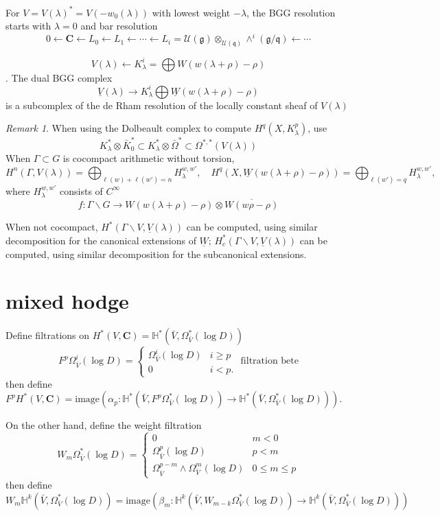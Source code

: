 \documentclass[leqno]{amsart}
\newcommand{\C}{\mathbf C}
\newcommand{\1}{\mathbf{1}}
\newcommand{\cfg}{\mathfrak{g}}
\newcommand{\cfq}{\mathfrak{q}}
\theoremstyle{definition}
\theoremstyle{remark}
\newtheorem{rem}[thm]{Remark}
\begin{document}
For  $V=V(\lambda)^*=V(-w_0(\lambda))$
with lowest weight  $-\lambda$,
the BGG resolution starts with $\lambda=0$ and
bar resolution
\[
0\leftarrow \C	
\leftarrow L_0
\leftarrow L_1
\leftarrow \cdots
\leftarrow L_i
=\mathcal{U}(\cfg)\otimes_{\mathcal{U}(\cfq)}
\wedge^i(\cfg/\cfq)
\leftarrow \cdots
\]

\[
	V(\lambda)\leftarrow
	K^i_\lambda=
	\bigoplus W(w(\lambda+\rho)-\rho)
\].
The dual BGG complex
\[
	\underline{V}(\lambda)
	\to K^i_\lambda
	\bigoplus \underline{W}
	(w(\lambda+\rho)-\rho)
\]
is a subcomplex 
of the de Rham resolution
of the locally constant sheaf of $V(\lambda)$

 \begin{rem}
	When using the Dolbeault complex
	to compute $H^q(X,K^p_\lambda)$,
	use 
	 \[
		K^*_\lambda\otimes \bar{K}_0^*
		\subset
		K^*_\lambda\otimes \bar{\Omega}^*
		\subset 
		\Omega^{*,*}(V(\lambda))
	\]
	When $\Gamma\subset G$
	is cocompact arithmetic
	without torsion,
	 \[
		 H^n(\Gamma,V(\lambda))=
		 \bigoplus_{\ell(w)+\ell(w')=n}
		 H^{w,w'}_\lambda,\quad
		 H^q(X, \underline{W}
		 (w(\lambda+\rho)-\rho))=
		 \bigoplus_{\ell(w')=q}
		 H^{w,w'}_\lambda,\quad
	\]
	where 
	$H^{w,w'}_\lambda$ 
	consists of  $C^\infty$
	 \[
		f\colon \Gamma\backslash G\to
		W(w(\lambda+\rho)-\rho)\otimes
		\overline{W(w\rho-\rho)}
	\]

	When not cocompact,
	$H^*(\Gamma\backslash V,
	\underline{V}(\lambda))$
	can be computed,
	using similar decomposition
	for the canonical extensions
	of  $\underline{W}$; 
	$H^*_c(\Gamma\backslash V,
	\underline{V}(\lambda))$
	can be computed,
	using similar decomposition
	for the subcanonical extensions.
\end{rem}

\section{mixed hodge}

Define filtrations on 
$H^*(V,\C)=\mathbb{H}^*
(\bar{V},\Omega^*_{\bar{V}}(\log D))$
\[
	F^p\Omega^i_{\bar{V}}(\log D)=
	\begin{cases}
		\Omega^i_{\bar{V}}(\log D)&
		i\geq p\\
		0 & i<p.
	\end{cases}
	\text{ filtration bete}
\]
then define
$F^pH^*(V,\C)=\text{image}
(\alpha_p\colon\mathbb{H}^*
(\bar{V},F^p\Omega^*_{\bar{V}}(\log D))\to
\mathbb{H}^*
(\bar{V},\Omega^*_{\bar{V}}(\log D))
)$.

On the other hand, define the weight filtration
\[
	W_m\Omega^*_{\bar{V}}(\log D)=
	\begin{cases}
		0 & m<0\\
		\Omega^p_{\bar{V}}(\log D)&
		p<m\\
		\Omega^{p-m}_{\bar{V}}\wedge
		\Omega^m_{\bar{V}}(\log D)&
		0\leq m\leq p
	\end{cases}
\]
then define
$W_m\mathbb{H}^k
(\bar{V},\Omega^*_{\bar{V}}(\log D))=
\text{image}(
\beta_m\colon
\mathbb{H}^k
(\bar{V},W_{m-k}\Omega^*_{\bar{V}}(\log D))\to
\mathbb{H}^k
(\bar{V},\Omega^*_{\bar{V}}(\log D))
)$ 
\end{document}
